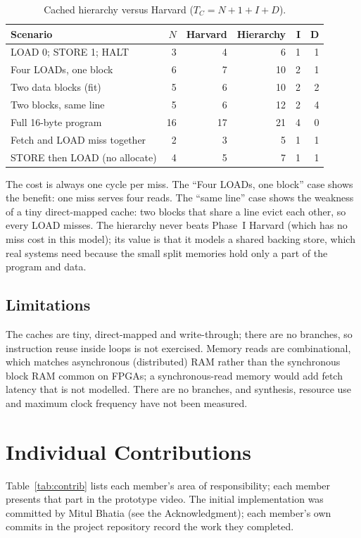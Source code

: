 \documentclass[conference,a4paper]{IEEEtran}
\begin{document}
\begin{table}[t]
\caption{Cached hierarchy versus Harvard ($T_C=N+1+I+D$).}
\label{tab:hier}
\centering
\begin{tabular}{lrrrrr}
\hline
Scenario & $N$ & Harvard & Hierarchy & I & D \\ \hline
LOAD 0; STORE 1; HALT & 3 & 4 & 6 & 1 & 1 \\
Four LOADs, one block & 6 & 7 & 10 & 2 & 1 \\
Two data blocks (fit) & 5 & 6 & 10 & 2 & 2 \\
Two blocks, same line & 5 & 6 & 12 & 2 & 4 \\
Full 16-byte program & 16 & 17 & 21 & 4 & 0 \\
Fetch and LOAD miss together & 2 & 3 & 5 & 1 & 1 \\
STORE then LOAD (no allocate) & 4 & 5 & 7 & 1 & 1 \\ \hline
\end{tabular}
\end{table}

The cost is always one cycle per miss. The ``Four LOADs, one block'' case
shows the benefit: one miss serves four reads. The ``same line'' case shows
the weakness of a tiny direct-mapped cache: two blocks that share a line evict
each other, so every LOAD misses. The hierarchy never beats Phase~I Harvard
(which has no miss cost in this model); its value is that it models a shared
backing store, which real systems need because the small split memories hold
only a part of the program and data.

\subsection{Limitations}
The caches are tiny, direct-mapped and write-through; there are no branches, so
instruction reuse inside loops is not exercised. Memory reads are combinational, which matches asynchronous (distributed)
RAM rather than the synchronous block RAM common on FPGAs; a
synchronous-read memory would add fetch latency that is not modelled.
There are no branches, and synthesis, resource use and maximum clock
frequency have not been measured.

\section{Individual Contributions}
Table~\ref{tab:contrib} lists each member's area of responsibility; each
member presents that part in the prototype video. The initial
implementation was committed by Mitul Bhatia (see the Acknowledgment);
each member's own commits in the project repository record the work they
completed.
\end{document}
